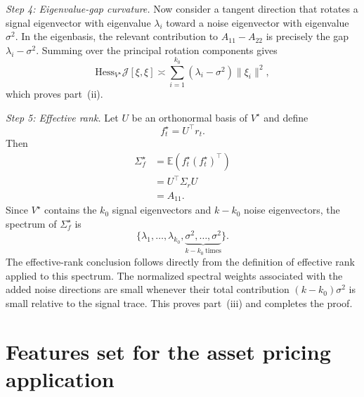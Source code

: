 \documentclass[11pt,letterpaper]{article}
\newcommand{\cJ}{\mathcal{J}}
\begin{document}
\smallskip
\noindent
\emph{Step 4: Eigenvalue-gap curvature.} Now consider a tangent direction that rotates a signal eigenvector with eigenvalue $\lambda_i$ toward a noise eigenvector with eigenvalue $\sigma^2$. In the eigenbasis, the relevant contribution to $A_{11}-A_{22}$ is precisely the gap $\lambda_i-\sigma^2$. Summing over the principal rotation components gives
\begin{equation*}
\mathrm{Hess}_{V^\star}\cJ[\xi,\xi]\asymp\sum_{i=1}^{k_0}(\lambda_i-\sigma^2)\|\xi_i\|^2,
\end{equation*}
which proves part~(ii).

\smallskip
\noindent
\emph{Step 5: Effective rank.} Let $U$ be an orthonormal basis of $V^\star$ and define
\begin{equation*}
f_t^\star=U^\top r_t.
\end{equation*}
Then
\begin{equation*}
\begin{split}
\Sigma_f^\star&=\mathbb{E}(f_t^\star(f_t^\star)^\top)\\
&=U^\top\Sigma_r U\\
&=A_{11}.
\end{split}
\end{equation*}
Since $V^\star$ contains the $k_0$ signal eigenvectors and $k-k_0$ noise eigenvectors, the spectrum of $\Sigma_f^\star$ is
\begin{equation*}
\{\lambda_1,\ldots,\lambda_{k_0},\underbrace{\sigma^2,\ldots,\sigma^2}_{k-k_0\ \mathrm{times}}\}.
\end{equation*}
The effective-rank conclusion follows directly from the definition of effective rank applied to this spectrum. The normalized spectral weights associated with the added noise directions are small whenever their total contribution $(k-k_0)\sigma^2$ is small relative to the signal trace. This proves part~(iii) and completes the proof.


\section{Features set for the asset pricing application}
\end{document}
